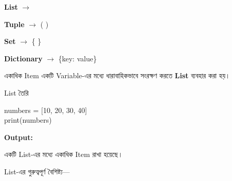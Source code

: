 \begin{rememberbox}

\begin{center}

\textbf{List}
\(\longrightarrow\)
\textenglish{\ttfamily [ ]}

\qquad

\textbf{Tuple}
\(\longrightarrow\)
\textenglish{\ttfamily ( )}

\qquad

\textbf{Set}
\(\longrightarrow\)
\textenglish{\ttfamily \{ \}}

\medskip

\textbf{Dictionary}
\(\longrightarrow\)
\textenglish{\ttfamily \{key: value\}}

\end{center}

\end{rememberbox}



একাধিক Item একটি Variable-এর মধ্যে ধারাবাহিকভাবে সংরক্ষণ করতে
\textbf{List} ব্যবহার করা হয়।

\begin{codeoutputbox}{List তৈরি}

\noindent
\begin{minipage}[t]{0.53\linewidth}
\codeheading

\begin{english}
\ttfamily
numbers = [10, 20, 30, 40]\\
print(numbers)
\end{english}

\end{minipage}
\hfill
\begin{minipage}[t]{0.43\linewidth}
\outputheading

\textbf{Output:}

\begin{center}
\textenglish{\ttfamily [10, 20, 30, 40]}
\end{center}

একটি List-এর মধ্যে একাধিক Item রাখা হয়েছে।

\end{minipage}

\end{codeoutputbox}

List-এর গুরুত্বপূর্ণ বৈশিষ্ট্য—

